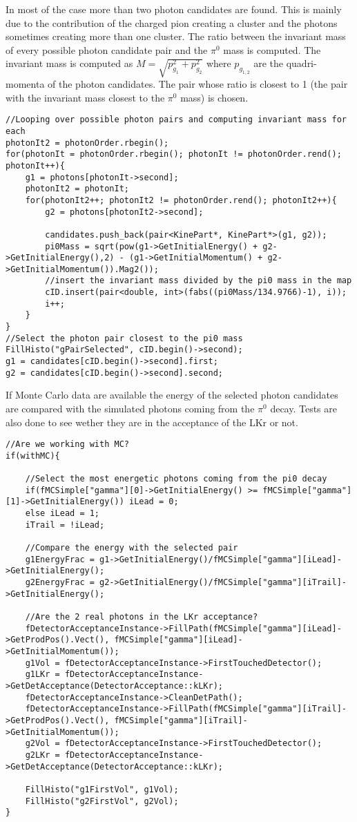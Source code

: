 In most of the case more than two photon candidates are found. This is mainly due to the
contribution of the charged pion creating a cluster and the photons sometimes creating more than one
cluster. The ratio between the invariant mass of every possible photon candidate pair and the
$\pi^0$ mass is computed. The invariant mass is computed as $M = \sqrt{p_{g_1}^2 + p_{g_2}^2}$ where
$p_{g_{1,2}}$ are the quadri-momenta of the photon candidates. The pair whose ratio is closest to 1
(the pair with the invariant mass closest to the $\pi^0$ mass) is chosen.
\begin{lstlisting}
//Looping over possible photon pairs and computing invariant mass for each
photonIt2 = photonOrder.rbegin();
for(photonIt = photonOrder.rbegin(); photonIt != photonOrder.rend(); photonIt++){
	g1 = photons[photonIt->second];
	photonIt2 = photonIt;
	for(photonIt2++; photonIt2 != photonOrder.rend(); photonIt2++){
		g2 = photons[photonIt2->second];

		candidates.push_back(pair<KinePart*, KinePart*>(g1, g2));
		pi0Mass = sqrt(pow(g1->GetInitialEnergy() + g2->GetInitialEnergy(),2) - (g1->GetInitialMomentum() + g2->GetInitialMomentum()).Mag2());
		//insert the invariant mass divided by the pi0 mass in the map
		cID.insert(pair<double, int>(fabs((pi0Mass/134.9766)-1), i));
		i++;
	}
}
//Select the photon pair closest to the pi0 mass
FillHisto("gPairSelected", cID.begin()->second);
g1 = candidates[cID.begin()->second].first;
g2 = candidates[cID.begin()->second].second;
\end{lstlisting}

If Monte Carlo data are available the energy of the selected photon candidates are compared with the
simulated photons coming from the $\pi^0$ decay. Tests are also done to see wether they are in the
acceptance of the LKr or not. 
\begin{lstlisting}
//Are we working with MC?
if(withMC){

	//Select the most energetic photons coming from the pi0 decay
	if(fMCSimple["gamma"][0]->GetInitialEnergy() >= fMCSimple["gamma"][1]->GetInitialEnergy()) iLead = 0;
	else iLead = 1;
	iTrail = !iLead;

	//Compare the energy with the selected pair
	g1EnergyFrac = g1->GetInitialEnergy()/fMCSimple["gamma"][iLead]->GetInitialEnergy();
	g2EnergyFrac = g2->GetInitialEnergy()/fMCSimple["gamma"][iTrail]->GetInitialEnergy();

	//Are the 2 real photons in the LKr acceptance?
	fDetectorAcceptanceInstance->FillPath(fMCSimple["gamma"][iLead]->GetProdPos().Vect(), fMCSimple["gamma"][iLead]->GetInitialMomentum());
	g1Vol = fDetectorAcceptanceInstance->FirstTouchedDetector();
	g1LKr = fDetectorAcceptanceInstance->GetDetAcceptance(DetectorAcceptance::kLKr);
	fDetectorAcceptanceInstance->CleanDetPath();
	fDetectorAcceptanceInstance->FillPath(fMCSimple["gamma"][iTrail]->GetProdPos().Vect(), fMCSimple["gamma"][iTrail]->GetInitialMomentum());
	g2Vol = fDetectorAcceptanceInstance->FirstTouchedDetector();
	g2LKr = fDetectorAcceptanceInstance->GetDetAcceptance(DetectorAcceptance::kLKr);

	FillHisto("g1FirstVol", g1Vol);
	FillHisto("g2FirstVol", g2Vol);
}
\end{lstlisting}

